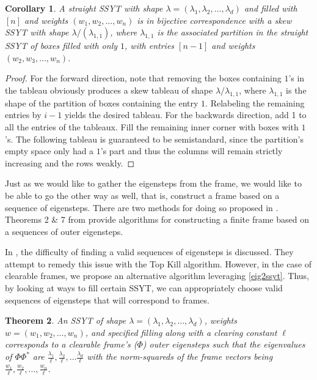 \documentclass[10pt]{article}
\theoremstyle{plain}
\newtheorem{thm}{Theorem}[section]
\newtheorem{corollary}[thm]{Corollary}
\theoremstyle{definition}
\begin{document}
\begin{corollary}\label{straight2skew}
A straight SSYT with shape $\lambda = (\lambda_1, \lambda_2, \dots, \lambda_d)$ and filled with $[n]$ and weights $(w_1, w_2, \dots, w_n)$ is in bijective correspondence with a skew SSYT with shape $\lambda / (\lambda_{1,1})$, where $\lambda_{1,1}$ is the associated partition in the straight SSYT of boxes filled with only $1$, with entries $[n-1]$ and weights $(w_2, w_3,\dots, w_n)$.
\end{corollary}

\begin{proof}
For the forward direction, note that removing the boxes containing $1$'s in the tableau obviously produces a skew tableau of shape $\lambda / \lambda_{1,1}$, where $\lambda_{1,1}$ is the shape of the partition of boxes containing the entry $1$. Relabeling the remaining entries by $i - 1$ yields the desired tableau. For the backwards direction, add 1 to all the entries of the tableaux. Fill the remaining inner corner with boxes with $1$'s. The following tableau is guaranteed to be semistandard, since the partition's empty space only had a $1$'s part and thus the columns will remain strictly increasing and the rows weakly.
\end{proof}

Just as we would like to gather the eigensteps from the frame, we would like to be able to go the other way as well, that is, construct a frame based on a sequence of eigensteps. There are two methods for doing so proposed in \cite{cfmconstructingfiniteframes}. Theorems 2 \& 7 from \cite{cfmconstructingfiniteframes} provide algorithms for constructing a finite frame based on a sequences of outer eigensteps. 

In \cite{cfmconstructingfiniteframes}, the difficulty of finding a valid sequences of eigensteps is discussed. They attempt to remedy this issue with the Top Kill algorithm. However, in the case of clearable frames, we propose an alternative algorithm leveraging \ref{eig2ssyt}. Thus, by looking at ways to fill certain SSYT, we can appropriately choose valid sequences of eigensteps that will correspond to frames.

\begin{thm}\label{bigguy} 
An SSYT of shape $\lambda = (\lambda_1, \lambda_2, \dots, \lambda_d)$, weights $w = (w_1, w_2, \dots, w_n)$, and specified filling along with a clearing constant $\ell$ corresponds to a clearable frame's ($\Phi$) outer eigensteps such that the eigenvalues of $\Phi\Phi^\ast$ are $\frac{\lambda_1}{\ell}, \frac{\lambda_2}{\ell}, \dots \frac{\lambda_d}{\ell}$  with the norm-squareds of the frame vectors being $\frac{w_1}{\ell}, \frac{w_2}{\ell}, \dots, \frac{w_n}{\ell} $. 
\end{thm}
\end{document}

